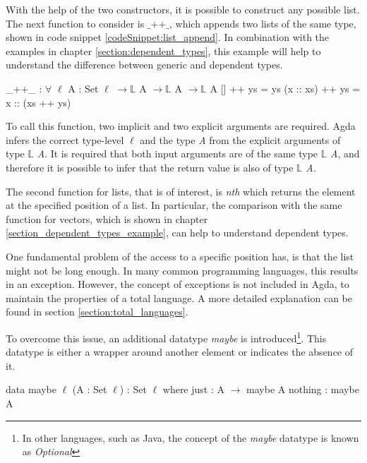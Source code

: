 With the help of the two constructors, it is possible to construct any possible list. 
The next function to consider is $\text{\_++\_}$, which appends two lists of the same type, shown in code snippet \ref{codeSnippet:list_append}. 
In combination with the examples in chapter \ref{section:dependent_types}, this example will help to understand the difference between generic and dependent types.

\begin{codesnippet}[mathescape=true, caption={Definition of the list append function in Agda}, label={codeSnippet:list_append}]
_++_ : $\forall$ {$\ell$} {A : Set $\ell$} $\rightarrow \mathbb{L}$ A $\rightarrow \mathbb{L}$ A $\rightarrow \mathbb{L}$ A
  []        ++ ys = ys
  (x :: xs) ++ ys = x :: (xs ++ ys)
\end{codesnippet}

To call this function, two implicit and two explicit arguments are required. 
Agda infers the correct type-level $\ell$ and the type \emph{A} from the explicit arguments of type $\mathbb{L}$ \emph{A}. 
It is required that both input arguments are of the same type $\mathbb{L}$ \emph{A}, and therefore it is possible to infer that the return value is also of type $\mathbb{L}$ \emph{A}.

The second function for lists, that is of interest, is \emph{nth} which returns the element at the specified position of a list.
In particular, the comparison with the same function for vectors, which is shown in chapter \ref{section_dependent_types_example}, can help to understand dependent types.

One fundamental problem of the access to a specific position has, is that the list might not be long enough.
In many common programming languages, this results in an exception. However, the concept of exceptions is not included in Agda, to maintain the properties of a total language.
A more detailed explanation can be found in section \ref{section:total_languages}.

To overcome this issue, an additional datatype \emph{maybe} is introduced\footnote{In other languages, such as Java, the concept of the \emph{maybe} datatype is known as \emph{Optional}}.
This datatype is either a wrapper around another element or indicates the absence of it.

\begin{codesnippet}[mathescape=true, caption={Definition of the maybe datatype in Agda}, label={codeSnippet:maybe_datatype}]
data maybe {$\ell$} (A : Set $\ell$) : Set $\ell$ where
  just : A $\rightarrow$ maybe A
  nothing : maybe A
\end{codesnippet}

